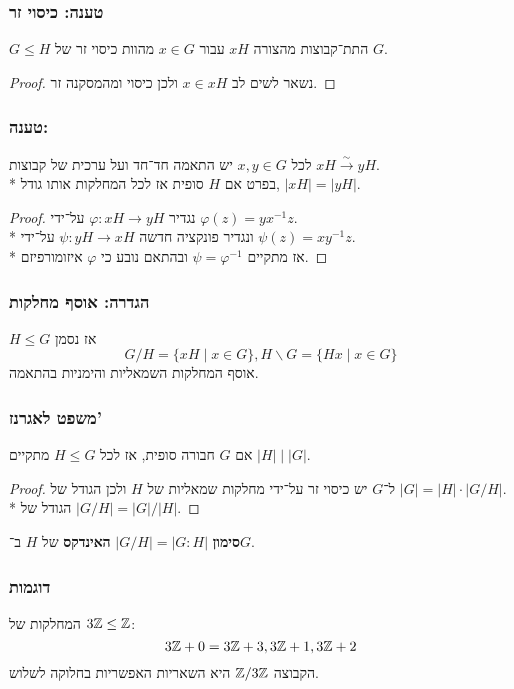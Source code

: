 \subsubsection{טענה: כיסוי זר}
$G \le H$ התת־קבוצות מהצורה $xH$ עבור $x \in G$ מהוות כיסוי זר של $G$.
\begin{proof}
	נשאר לשים לב $x \in xH$ ולכן כיסוי ומהמסקנה זר.
\end{proof}

\subsubsection{טענה: }
לכל $x, y \in G$ יש התאמה חד־חד ועל ערכית של קבוצות $xH \xrightarrow{\sim} yH$. \\*
בפרט אם $H$ סופית אז לכל המחלקות אותו גודל, $|xH| = |yH|$.
\begin{proof}
	נגדיר
	$\varphi : xH \to yH$ על־ידי $\varphi(z) = y x^{-1} z$. \\*
	ונגדיר פונקציה חדשה $\psi : yH \to xH$ על־ידי $\psi(z) = x y^{-1} z$. \\*
	אז מתקיים $\psi = \varphi^{-1}$ ובהתאם נובע כי $\varphi$ איזומורפיזם.
\end{proof}

\subsubsection{הגדרה: אוסף מחלקות}
$H \le G$ אז נסמן
\[
	G / H = \{ xH \mid x \in G \},
	H \backslash G = \{ Hx \mid x \in G \}
\]
אוסף המחלקות השמאליות והימניות בהתאמה.

\subsubsection{משפט לאגרנז'}
אם $G$ חבורה סופית, אז לכל $H \le G$ מתקיים $\left. |H| \mid |G| \right. $.
\begin{proof}
	ל־$G$ יש כיסוי זר על־ידי מחלקות שמאליות של $H$ ולכן הגודל של $|G| = |H| \cdot |G / H|$. \\*
	הגודל של $|G / H| = |G| / |H|$.
\end{proof}
\textbf{סימון}
$|G / H| = |G : H|$ \textbf{האינדקס} של $H$ ב־$G$.

\subsubsection{דוגמות}
המחלקות של $3\mathbb{Z} \le \mathbb{Z}$:
\[
	3\mathbb{Z} + 0 = 3\mathbb{Z} + 3, 3\mathbb{Z} + 1, 3\mathbb{Z} + 2
\]
הקבוצה $\mathbb{Z}/3\mathbb{Z}$ היא השאריות האפשריות בחלוקה לשלוש.

